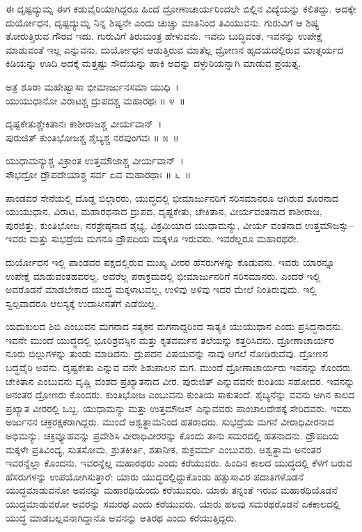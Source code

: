 ಈ ದೃಷ್ಟದ್ಯುಮ್ನ ಈಗ ಕಡುವೈರಿಯಾಗಿದ್ದರೂ ಹಿಂದೆ ದ್ರೋಣಾಚಾರ್ಯರಿಂದಲೇ ಬಿಲ್ಲಿನ ವಿದ್ಯೆಯನ್ನು ಕಲಿತದ್ದು. ಅದಕ್ಕೇ ದುರ್ಯೋಧನ, ದೃಷ್ಟದ್ಯುಮ್ನ ನಿನ್ನ ಶಿಷ್ಯನೇ ಎಂದು ಚುಚ್ಚು ಮಾತಿನಿಂದ ತಿವಿಯುವನು. ಗುರುವಿಗೆ ಆ ಶಿಷ್ಯ ತೋರುತ್ತಿರುವ ಗೌರವ ಇದು. ಗುರುವಿಗೆ ತಿರುಮಂತ್ರ ಹೇಳುವನು. ಇವನು ಬುದ್ಧಿವಂತ, ಇವನನ್ನು ಉಪೇಕ್ಷೆ ಮಾಡುವಂತೆ ಇಲ್ಲ ಎನ್ನುವನು. ದುರ್ಯೋಧನ ಆಡುತ್ತಿರುವ ಮಾತೆಲ್ಲ ದ್ರೋಣನ ಹೃದಯದಲ್ಲಿರುವ ಮಾತ್ಸರ್ಯದ ಕಿಡಿಯನ್ನು ಊದಿ ಅದಕ್ಕೆ ಮತ್ತಷ್ಟು ಸೌದೆಯನ್ನು ಹಾಕಿ ಅದನ್ನು ದಳ್ಳುರಿಯನ್ನಾಗಿ ಮಾಡುವ ಪ್ರಯತ್ನ.

\begin{shloka}
ಅತ್ರ ಶೂರಾ ಮಹೇಷ್ವಾಸಾ ಭೀಮಾರ್ಜುನಸಮಾ ಯುಧಿ~।\\ಯುಯುಧಾನೋ ವಿರಾಟಶ್ಚ ದ್ರುಪದಶ್ಚ ಮಹಾರಥಃ \hfill॥ ೪~॥
\end{shloka}

\begin{shloka}
ದೃಷ್ಟಕೇತುಶ್ಚೇಕಿತಾನಃ ಕಾಶೀರಾಜಶ್ಚ ವೀರ್ಯವಾನ್~।\\ಪುರುಜಿತ್ ಕುಂತಿಭೋಜಶ್ಚ ಶೈಬ್ಯಶ್ಚ ನರಪುಂಗವಃ \hfill॥ ೫~॥
\end{shloka}

\begin{shloka}
ಯುಧಾಮನ್ಯುಶ್ಚ ವಿಕ್ರಾಂತ ಉತ್ತಮೌಜಾಶ್ಚ ವೀರ್ಯವಾನ್~।\\ಸೌಭದ್ರೋ ದ್ರೌಪದೇಯಾಶ್ಚ ಸರ್ವ ಏವ ಮಹಾರಥಾಃ \hfill॥ ೬~॥
\end{shloka}

\begin{artha}
ಪಾಂಡವರ ಸೇನೆಯಲ್ಲಿ ದೊಡ್ಡ ಬಿಲ್ಗಾರರು, ಯುದ್ಧದಲ್ಲಿ ಭೀಮಾರ್ಜುನರಿಗೆ ಸರಿಸಮಾನರೂ ಆಗಿರುವ ಶೂರನಾದ ಯುಯುಧಾನ, ವಿರಾಟ, ಮಹಾರಥನಾದ ದ್ರುಪದ, ದೃಷ್ಟಕೇತು, ಚೇಕಿತಾನ, ವೀರ್ಯವಂತನಾದ ಕಾಶೀರಾಜ, ಪುರಜಿತ್ತು, ಕುಂತಿಭೋಜ, ನರಶ್ರೇಷ್ಠನಾದ ಶೈಭ್ಯ, ವಿಕ್ರಮಿಯಾದ ಯುಧಾಮನ್ಯು, ವೀರ್ಯ ವಂತನಾದ ಉತ್ತಮೌಜಸ್ಸು–ಇವರು ಮತ್ತು ಸುಭದ್ರೆಯ ಮಗನೂ ದ್ರೌಪದಿಯ ಮಕ್ಕಳೂ ಇರುವರು. ಇವರೆಲ್ಲರೂ ಮಹಾರಥರೇ.
\end{artha}

ದುರ್ಯೋಧನ ಇಲ್ಲಿ ಪಾಂಡವರ ಪಕ್ಷದಲ್ಲಿರುವ ಮುಖ್ಯ ವೀರರ ಹೆಸರುಗಳನ್ನು ಕೊಡುವನು. ಇವರು ಯಾರನ್ನೂ ಉಪೇಕ್ಷೆ ಮಾಡುವಂತಹವರಲ್ಲ. ಅವರೆಲ್ಲ ಪರಾಕ್ರಮದಲ್ಲಿ ಭೀಮಾರ್ಜುನರಿಗೆ ಸರಿಸಮಾನರು. ಎಂದರೆ ಇಲ್ಲಿ ಅವರೊಡನೆ ಮಾಡಬೇಕಾದ ಯುದ್ಧ ಮಕ್ಕಳಾಟವಲ್ಲ, ಉಳಿವು ಅಳಿವು ಇದರ ಮೇಲೆ ನಿಂತಿರುವುದು. ಇಲ್ಲಿ ಸ್ವಲ್ಪವಾದರೂ ಆಲಸ್ಯಕ್ಕೆ ಉದಾಸೀನತೆಗೆ ಎಡೆಯಿಲ್ಲ.

ಯದುಕುಲದ ಶಿಬಿ ಎಂಬುವನ ಮಗನಾದ ಸತ್ಯಕನ ಮಗನಾದ್ದರಿಂದ ಸಾತ್ಯಕಿ ಯುಯುಧಾನ ಎಂದು ಪ್ರಸಿದ್ಧನಾದನು. ಇವನೇ ಮುಂದೆ ಯುದ್ಧದಲ್ಲಿ ಭೂರಿಶ್ರವಸ್ಸಿನ ಮತ್ತು ಕೃತವರ್ಮನ ತಲೆಯನ್ನು ಕತ್ತರಿಸಿದನು. ದ್ರೋಣಾಚಾರ್ಯರ ನೂರು ಬಿಲ್ಲುಗಳನ್ನು ತುಂಡು ಮಾಡಿದನು. ದ್ರುಪದನ ವಿಷಯವನ್ನು ನಾವು ಆಗಲೆ ನೋಡಿರುವೆವು. ದ್ರೋಣನ ಬದ್ಧವೈರಿ ಅವನು. ದೃಷ್ಟಕೇತು ಎನ್ನುವ ವನೇ ಶಿಶುಪಾಲನ ಮಗ. ಮುಂದೆ ದ್ರೋಣಾಚಾರ್ಯರು ಇವನನ್ನು ಕೊಂದರು. ಚೇಕಿತಾನ ಎಂಬುವನು ವೃಷ್ಣಿ ವಂಶದ ಪ್ರಖ್ಯಾತನಾದ ವೀರ. ಪುರುಜಿತ್ ಎನ್ನುವವನೇ ಕುಂತಿಯ ಸಹೋದರ. ಇವನನ್ನು ಅನಂತರ ದ್ರೋಣರು ಕೊಂದರು. ಕುಂತಿಭೋಜ ಎಂಬುವನು ಕುಂತಿಯ ಸಾಕುತಂದೆ. ಶೈಬ್ಯನೆನ್ನು ವವನು ಆಗಿನ ಕಾಲದ ಪ್ರಖ್ಯಾತ ವೀರರಲ್ಲಿ ಒಬ್ಬ. ಯುಧಾಮನ್ಯು ಮತ್ತು ಉತ್ತಮೌಜಸ್ ಎನ್ನುವವರು ಪಾಂಚಾಲದೇಶಕ್ಕೆ ಸೇರಿದವರು. ಇವರು ಅರ್ಜುನನ ಚಕ್ರರಕ್ಷಕರಾಗಿದ್ದರು. ಮುಂದೆ ಅಶ್ವತ್ಥಾಮನಿಂದ ಹತರಾದರು. ಸುಭದ್ರೆಯ ಮಗನೆ ವೀರಾಧಿವೀರನಾದ ಅಭಿಮನ್ಯು. ಚಕ್ರವ್ಯೂಹವನ್ನು ಪ್ರವೇಶಿಸಿ ವೀರಾಧಿವೀರರನ್ನು ಕೊಂದು ತಾನು ಸಮರದಲ್ಲಿ ಹತನಾದನು. ದ್ರೌಪದಿಯ ಮಕ್ಕಳೇ ಪ್ರತಿವಿಂದ್ಯ, ಸುತಸೋಮ, ಶ್ರುತಕೀರ್ತಿ, ಶತಾನೀಕ, ಶುಕ್ರವರ್ಮ ಎಂಬುವರು. ಅಶ್ವತ್ಥಾಮ ಅನಂತರ ಇವರನ್ನೆಲ್ಲಾ ಕೊಂದನು. ಇವರನ್ನೆಲ್ಲ ಮಹಾರಥರು ಎಂದು ಕರೆಯುವರು. ಹಿಂದಿನ ಕಾಲದ ಯುದ್ಧದಲ್ಲಿ ಕೆಳಗೆ ಬರುವ ಹೆಸರುಗಳನ್ನು ಉಪಯೋಗಿಸುತ್ತಾರೆ: ಯಾರು ಯುದ್ಧದಲ್ಲಿದ್ದುಕೊಂಡು ಹತ್ತುಸಾವಿರ ಪದಾತಿಗಳೊಡನೆ ಯುದ್ಧಮಾಡುವನೋ ಅವನನ್ನು ಮಹಾರಥಿಯೆಂದು ಕರೆಯುವರು. ಯಾರು ತನ್ನಂತೆ ಇರುವ ಮಹಾರಥಿಯೊಡನೆ ಯುದ್ಧಮಾಡುವರೋ ಅವರನ್ನು ಸಮರಥ ಎಂದು ಕರೆಯುವರು. ಯಾರು ಹಲವು ಸಮರಥರೊಡನೆ ಏಕಕಾಲದಲ್ಲಿ ಯುದ್ಧ ಮಾಡಬಲ್ಲವನಾಗಿದ್ದಾನೊ ಅವನನ್ನು ಅತಿರಥ ಎಂದು ಕರೆಯುತ್ತಿದ್ದರು.

